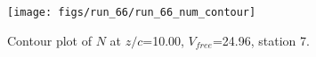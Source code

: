 \begin{figure}[H]
\centering
\texttt{[image: figs/run\_66/run\_66\_num\_contour]}
\caption{Contour plot of $N$ at $z/c$=10.00, $V_{free}$=24.96, station 7.}
\label{fig:run_66_num_contour}
\end{figure}


